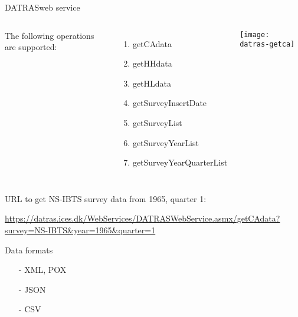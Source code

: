 \documentclass[aspectratio=169]{beamer}
\begin{document}

\begin{frame}{DATRAS}{web service}
  \begin{columns}
    \scriptsize
    \footnotesize The following operations are supported:\\[-0.5ex]
    \begin{enumerate}[-]\blue
      \item getCAdata\\[-1ex]
      \item getHHdata\\[-1ex]
      \item getHLdata\\[-1ex]
      \item getSurveyInsertDate\\[-1ex]
      \item getSurveyList\\[-1ex]
      \item getSurveyYearList\\[-1ex]
      \item getSurveyYearQuarterList\\[-1ex]
    \end{enumerate}
    \vspace{1ex}\texttt{[image: datras-getca]}
  \end{columns}
  \vspace{5ex}\footnotesize
  {\green URL to get NS-IBTS survey data from 1965, quarter 1:}\\[2ex]
  \hspace{3.6ex}
  \begin{minipage}{60ex}
    \setlength\parindent{-15pt}
    \scriptsize\url{https://datras.ices.dk/WebServices/DATRASWebService.asmx/getCAdata?survey=NS-IBTS\&year=1965\&quarter=1}
  \end{minipage}
\end{frame}



\begin{frame}{Data formats}
  \begin{itemize}
    \item[-] XML, POX
    \item[-] JSON
    \item[-] CSV
  \end{itemize}
\end{frame}
\end{document}
